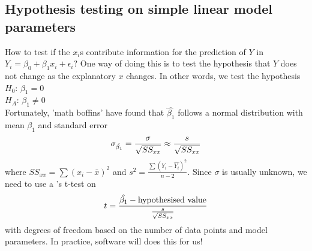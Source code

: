 \subsection{Hypothesis testing on simple linear model parameters}

How to test if the $x_i$s contribute information for the prediction of $Y$ in $Y_i=\beta_0+\beta_1x_i+\epsilon_i$? One way of doing this is to test the hypothesis that $Y$ does not change as the explanatory $x$ changes. In other words, we test the hypothesis \\
$H_0$: $\beta_1=0$ \\
$H_A$: $\beta_1\neq 0$ \\
Fortunately, 'math boffins' have found that $\hat{\beta_1}$ follows a normal distribution with mean $\beta_1$ and standard error 
\begin{align}
	\sigma_{\hat{\beta_1}} = \frac{\sigma}{\sqrt{SS_{xx}}}\approx \frac{s}{\sqrt{SS_{xx}}}\notag
\end{align}
where $SS_{xx}=\sum(x_i-\bar{x})^2$ and $s^2=\frac{\sum (Y_i-\hat{Y_i})^2}{n-2}$. Since $\sigma$ is usually unknown, we need to use a 's t-test on
\begin{align}
	t = \frac{\hat{\beta_1}-\text{hypothesised value}}{\frac{s}{\sqrt{SS_{xx}}}} \notag
\end{align}
with degrees of freedom based on the number of data points and model parameters. In practice, software will does this for us!